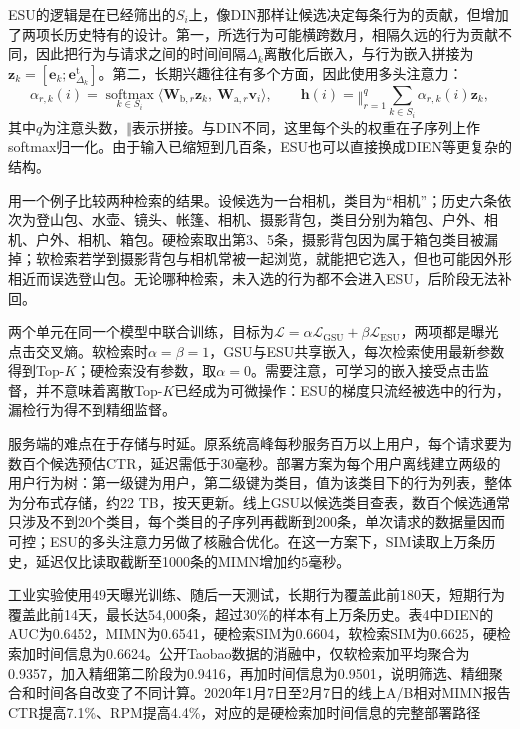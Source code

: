 ESU的逻辑是在已经筛出的$S_i$上，像DIN那样让候选决定每条行为的贡献，但增加了两项长历史特有的设计。第一，所选行为可能横跨数月，相隔久远的行为贡献不同，因此把行为与请求之间的时间间隔$\Delta_k$离散化后嵌入，与行为嵌入拼接为$\bm{z}_k=[\bm{e}_k;\bm{e}^{\mathrm t}_{\Delta_k}]$。第二，长期兴趣往往有多个方面，因此使用多头注意力：
\begin{equation}
  \alpha_{r,k}(i)=\operatorname*{softmax}_{k\in S_i}
     \langle\bm{W}_{\mathrm b,r}\bm{z}_k,\ \bm{W}_{\mathrm a,r}\bm{v}_i\rangle,\qquad
  \bm{h}(i)=\mathop{\Vert}_{r=1}^{q}\sum_{k\in S_i}\alpha_{r,k}(i)\bm{z}_k,
  \label{eq:rs-sim-interest}
\end{equation}
其中$q$为注意头数，$\Vert$表示拼接。与DIN不同，这里每个头的权重在子序列上作softmax归一化。由于输入已缩短到几百条，ESU也可以直接换成DIEN等更复杂的结构。

用一个例子比较两种检索的结果。设候选为一台相机，类目为“相机”；历史六条依次为登山包、水壶、镜头、帐篷、相机、摄影背包，类目分别为箱包、户外、相机、户外、相机、箱包。硬检索取出第3、5条，摄影背包因为属于箱包类目被漏掉；软检索若学到摄影背包与相机常被一起浏览，就能把它选入，但也可能因外形相近而误选登山包。无论哪种检索，未入选的行为都不会进入ESU，后阶段无法补回。

两个单元在同一个模型中联合训练，目标为$\mathcal{L}=\alpha\mathcal{L}_{\mathrm{GSU}}+\beta\mathcal{L}_{\mathrm{ESU}}$，两项都是曝光点击交叉熵。软检索时$\alpha=\beta=1$，GSU与ESU共享嵌入，每次检索使用最新参数得到Top-$K$；硬检索没有参数，取$\alpha=0$。需要注意，可学习的嵌入接受点击监督，并不意味着离散Top-$K$已经成为可微操作：ESU的梯度只流经被选中的行为，漏检行为得不到精细监督。

服务端的难点在于存储与时延。原系统高峰每秒服务百万以上用户，每个请求要为数百个候选预估CTR，延迟需低于30毫秒。部署方案为每个用户离线建立两级的用户行为树：第一级键为用户，第二级键为类目，值为该类目下的行为列表，整体为分布式存储，约22 TB，按天更新。线上GSU以候选类目查表，数百个候选通常只涉及不到20个类目，每个类目的子序列再截断到200条，单次请求的数据量因而可控；ESU的多头注意力另做了核融合优化。在这一方案下，SIM读取上万条历史，延迟仅比读取截断至1000条的MIMN增加约5毫秒。

工业实验使用49天曝光训练、随后一天测试，长期行为覆盖此前180天，短期行为覆盖此前14天，最长达54,000条，超过30\%的样本有上万条历史。表4中DIEN的AUC为0.6452，MIMN为0.6541，硬检索SIM为0.6604，软检索SIM为0.6625，硬检索加时间信息为0.6624。公开Taobao数据的消融中，仅软检索加平均聚合为0.9357，加入精细第二阶段为0.9416，再加时间信息为0.9501，说明筛选、精细聚合和时间各自改变了不同计算。2020年1月7日至2月7日的线上A/B相对MIMN报告CTR提高7.1\%、RPM提高4.4\%，对应的是硬检索加时间信息的完整部署路径

